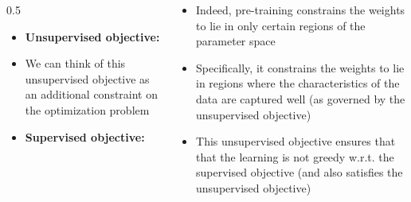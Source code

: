 
\begin{frame}
	\begin{columns}
		\begin{column} {0.5\textwidth}
			\begin{overlayarea}{\textwidth}{\textheight}
				
				\begin{itemize}
					\justifying
					\item<3-> \textbf{Unsupervised objective:}
					
					
					\item<4-> We can think of this unsupervised objective as an additional constraint on the optimization problem
					\item<5-> \textbf{Supervised objective:}
					
					
				\end{itemize}
			\end{overlayarea}
		\end{column}
		\begin{column}{0.5\textwidth}
			\begin{overlayarea}{\textwidth}{\textheight}
				
				\begin{itemize}
					\justifying
					\item<1-> Indeed, pre-training constrains the weights to lie in only certain regions of the parameter space
					\item<2-> Specifically, it constrains the weights to lie in regions where the characteristics of the data are captured well (as governed by the unsupervised objective)
					\item<5-> This unsupervised objective ensures that that the learning is not greedy w.r.t. the supervised objective (and also satisfies the unsupervised objective)
				\end{itemize}
			\end{overlayarea}
		\end{column}
		
	\end{columns}
\end{frame}

